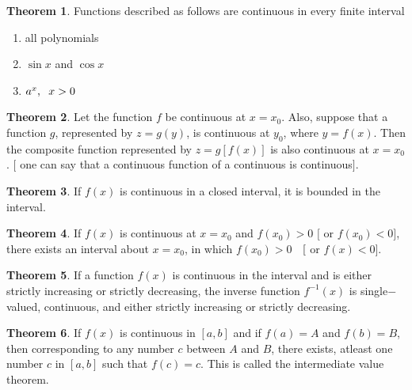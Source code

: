 \documentclass[11pt,a4paper]{article}
\theoremstyle{definition}
\newtheorem{thm}{Theorem}[subsection]
\begin{document}
\begin{thm}


Functions described as follows are continuous in every finite interval
\begin{enumerate}
\item all polynomials
\item $\sin x $ and $\cos x$
\item $a^x,\hspace{0.2cm} x>0$
\end{enumerate}
\end{thm}

\begin{thm}


Let the function $f$ be continuous at $x = x_0$. Also, suppose that a function $g$, represented by $z = g(y)$, is continuous at $y_0$, where $y = f(x)$. Then the composite function represented by $z = g[f(x)]$ is also continuous at $x = x_0$. $[$ one can say that a continuous function of a continuous is continuous$]$.
\end{thm}


\begin{thm}


If $f(x)$ is continuous in a closed interval, it is bounded in the interval.
\end{thm}


\begin{thm}


If $f(x)$ is continuous at $x = x_0$ and $f(x_0) > 0$ $[$ or $f(x_0)< 0]$, there exists an interval about $x = x_0$, in which $f(x_0) > 0$ $\hspace{0.2cm}[$ or $f(x)< 0]$.
\end{thm}


\begin{thm}


If a function $f(x)$ is continuous in the interval and is either strictly increasing or strictly decreasing, the inverse function $f^{-1}(x)$ is single$-$valued, continuous, and either strictly increasing or strictly decreasing.
\end{thm}


\begin{thm}


If $f(x)$ is continuous in $[a,b]$ and if $f(a) = A$ and $f(b) = B$, then corresponding to any number $c$ between $A$ and $B$, there exists, atleast one number $c$ in $[a,b]$ such that $f(c)= c$. This is  called the intermediate value theorem.
\end{thm}
\end{document}
